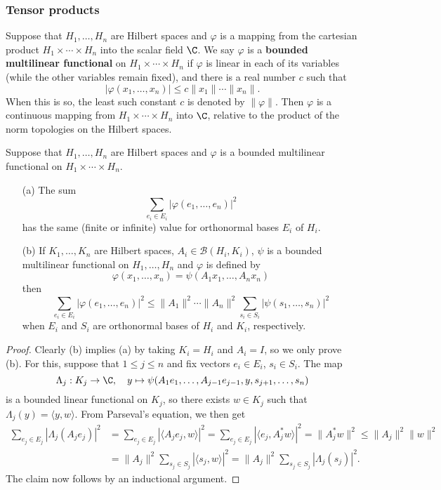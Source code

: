 \subsubsection{Tensor products}
Suppose that $H_1,\dots,H_n$ are Hilbert spaces and $\varphi$ is a mapping from the cartesian product $H_1\times\cdots\times H_n$ into the scalar field $\C$. We say $\varphi$ is a \textbf{bounded multilinear functional} on $H_1\times\cdots\times H_n$ if $\varphi$ is linear in each of its variables (while the other variables remain fixed), and there is a real number $c$ such that
\[|\varphi(x_1,\dots,x_n)|\leq c\|x_1\|\cdots\|x_n\|.\]
When this is so, the least such constant $c$ is denoted by $\|\varphi\|$. Then $\varphi$ is a continuous mapping from $H_1\times\cdots\times H_n$ into $\C$, relative to the product of the norm topologies on the Hilbert spaces.
\begin{proposition}\label{Hilbert-Schmidt functional def}
Suppose that $H_1,\dots,H_n$ are Hilbert spaces and $\varphi$ is a bounded multilinear functional on $H_1\times\cdots\times H_n$.
\begin{itemize}
\item[(a)] The sum
\[\sum_{e_i\in E_i}|\varphi(e_1,\dots,e_n)|^2\]
has the same (finite or infinite) value for orthonormal bases $E_i$ of $H_i$.
\item[(b)] If $K_1,\dots,K_n$ are Hilbert spaces, $A_i\in\mathcal{B}(H_i,K_i)$, $\psi$ is a bounded multilinear functional on $H_1,\dots,H_n$ and $\varphi$ is defined by
\[\varphi(x_1,\dots,x_n)=\psi(A_1x_1,\dots,A_nx_n)\]
then 
\[\sum_{e_i\in E_i}|\varphi(e_1,\dots,e_n)|^2\leq\|A_1\|^2\cdots\|A_n\|^2\sum_{s_i\in S_i}|\psi(s_1,\dots,s_n)|^2\]
when $E_i$ and $S_i$ are orthonormal bases of $H_i$ and $K_i$, respectively.
\end{itemize}
\end{proposition}
\begin{proof}
Clearly (b) implies (a) by taking $K_i=H_i$ and $A_i=I$, so we only prove (b). For this, suppose that $1\leq j\leq n$ and fix vectors $e_i\in E_i$, $s_i\in S_i$. The map
\[\Lambda_j:K_j\to\C,\quad y\mapsto\psi(A_1e_1,\dots,A_{j-1}e_{j-1},y,s_{j+1},\dots,s_n)\]
is a bounded linear functional on $K_j$, so there exists $w\in K_j$ such that $\Lambda_j(y)=\langle y,w\rangle$. From Parseval's equation, we then get
\begin{align*}
\sum_{e_j\in E_j}|\Lambda_j(A_je_j)|^2&=\sum_{e_j\in E_j}|\langle A_je_j,w\rangle|^2=\sum_{e_j\in E_j}|\langle e_j,A_j^*w\rangle|^2=\|A_j^*w\|^2\leq\|A_j\|^2\|w\|^2\\
&=\|A_j\|^2\sum_{s_j\in S_j}|\langle s_j,w\rangle|^2=\|A_j\|^2\sum_{s_j\in S_j}|\Lambda_j(s_j)|^2.
\end{align*}
The claim now follows by an inductional argument.
\end{proof}
